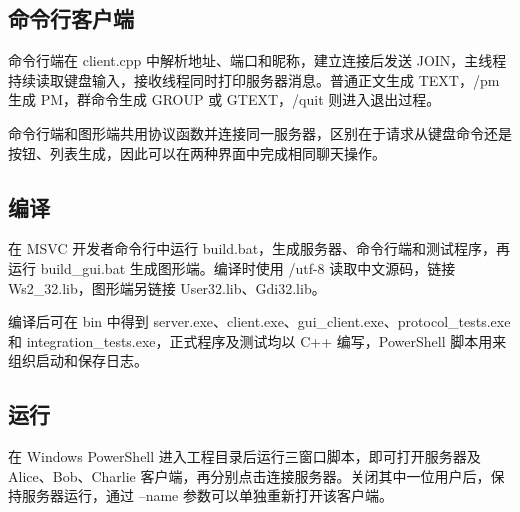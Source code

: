 \documentclass[UTF8,a4paper,10pt,fontset=fandol]{ctexart}
\begin{document}
\subsection{命令行客户端}
命令行端在 client.cpp 中解析地址、端口和昵称，建立连接后发送 JOIN，主线程持续读取键盘输入，接收线程同时打印服务器消息。普通正文生成 TEXT，/pm 生成 PM，群命令生成 GROUP 或 GTEXT，/quit 则进入退出过程。

命令行端和图形端共用协议函数并连接同一服务器，区别在于请求从键盘命令还是按钮、列表生成，因此可以在两种界面中完成相同聊天操作。

\subsection{编译}
在 MSVC 开发者命令行中运行 build.bat，生成服务器、命令行端和测试程序，再运行 build\_gui.bat 生成图形端。编译时使用 /utf-8 读取中文源码，链接 Ws2\_32.lib，图形端另链接 User32.lib、Gdi32.lib。

\medskip
编译后可在 bin 中得到 server.exe、client.exe、gui\_client.exe、protocol\_tests.exe 和 integration\_tests.exe，正式程序及测试均以 C++ 编写，PowerShell 脚本用来组织启动和保存日志。

\subsection{运行}
在 Windows PowerShell 进入工程目录后运行三窗口脚本，即可打开服务器及 Alice、Bob、Charlie 客户端，再分别点击连接服务器。关闭其中一位用户后，保持服务器运行，通过 --name 参数可以单独重新打开该客户端。
\end{document}
